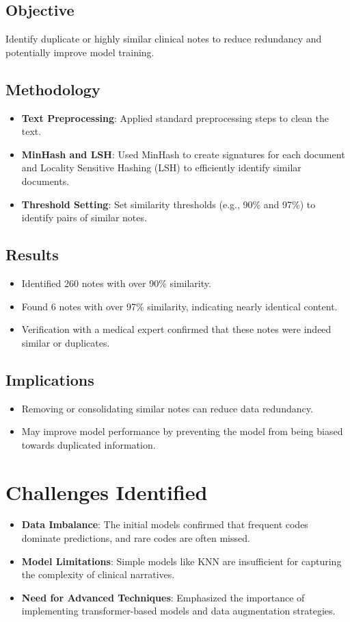 \documentclass[12pt,a4paper]{report}
\begin{document}
\subsection{Objective}
Identify duplicate or highly similar clinical notes to reduce redundancy and potentially improve model training.

\subsection{Methodology}
\begin{itemize}
    \item \textbf{Text Preprocessing}: Applied standard preprocessing steps to clean the text.
    \item \textbf{MinHash and LSH}: Used MinHash to create signatures for each document and Locality Sensitive Hashing (LSH) to efficiently identify similar documents.
    \item \textbf{Threshold Setting}: Set similarity thresholds (e.g., 90\% and 97\%) to identify pairs of similar notes.
\end{itemize}

\subsection{Results}
\begin{itemize}
    \item Identified 260 notes with over 90\% similarity.
    \item Found 6 notes with over 97\% similarity, indicating nearly identical content.
    \item Verification with a medical expert confirmed that these notes were indeed similar or duplicates.
\end{itemize}

\subsection{Implications}
\begin{itemize}
    \item Removing or consolidating similar notes can reduce data redundancy.
    \item May improve model performance by preventing the model from being biased towards duplicated information.
\end{itemize}

\section{Challenges Identified}
\begin{itemize}
    \item \textbf{Data Imbalance}: The initial models confirmed that frequent codes dominate predictions, and rare codes are often missed.
    \item \textbf{Model Limitations}: Simple models like KNN are insufficient for capturing the complexity of clinical narratives.
    \item \textbf{Need for Advanced Techniques}: Emphasized the importance of implementing transformer-based models and data augmentation strategies.
\end{itemize}
\end{document}
